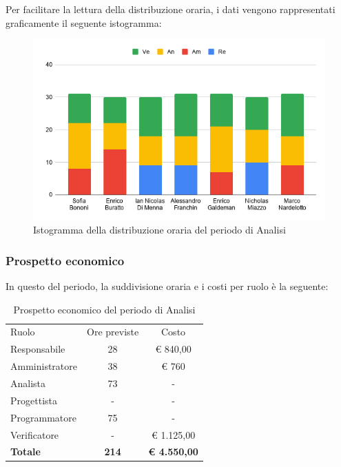 \documentclass[../piano-di-progetto.tex]{subfiles}
\begin{document}
  Per facilitare la lettura della distribuzione oraria, i dati vengono rappresentati graficamente il seguente istogramma:
  \begin{figure}[H]
    \centering
    \includegraphics[width=12cm]{img/ore-analisi.png}
    \caption{Istogramma della distribuzione oraria del periodo di Analisi}
    \label{fig:ore-componente-analisi}
  \end{figure}

  \subsubsection{Prospetto economico}
  In questo del periodo, la suddivisione oraria e i costi per ruolo è la seguente:

  \begin{table}[H]
    \centering
    \begin{tabular}{lcc}
      Ruolo           & Ore previste & Costo      \\
      Responsabile    & 28           & € 840,00          \\
      Amministratore  & 38            & € 760          \\
      Analista        & 73            & -          \\
      Progettista     & -            & -          \\
      Programmatore   & 75            & -          \\
      Verificatore    & -            & € 1.125,00          \\
      \textbf{Totale} & \textbf{214}   & \textbf{€ 4.550,00}
    \end{tabular}
    \caption{Prospetto economico del periodo di Analisi}
  \end{table}
\end{document}

